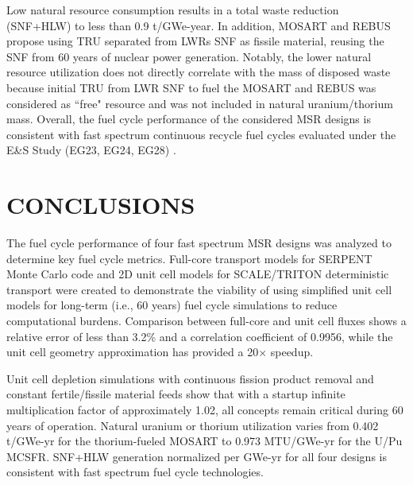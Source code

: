 \documentclass[letterpaper]{mandc2019}
\begin{document}
Low natural resource consumption results in a total waste reduction (\gls{SNF}+\gls{HLW}) to less than 0.9 t/GWe-year. %
In addition, \gls{MOSART} and REBUS propose using \gls{TRU} separated from \glspl{LWR} \gls{SNF} as fissile material, reusing the \gls{SNF} from 60 years of nuclear power generation. 
Notably, the lower natural resource utilization does not directly correlate with the mass of disposed waste because initial TRU from \gls{LWR} \gls{SNF} to fuel the \gls{MOSART} and REBUS was considered as ``free" resource and was not included in natural uranium/thorium mass. 
Overall, the fuel cycle performance of the considered \gls{MSR} designs is consistent with fast spectrum continuous recycle fuel cycles evaluated under the E\&S Study (EG23, EG24, EG28)  \cite{wigeland_nuclear_2014-4}. 
\section{CONCLUSIONS}
The fuel cycle performance of four fast spectrum \gls{MSR} designs was analyzed to determine key fuel cycle metrics. 
Full-core transport models for SERPENT Monte Carlo code and 2D unit cell models for SCALE/TRITON deterministic transport were created to demonstrate the viability of using simplified unit cell models for long-term (i.e., 60 years) fuel cycle simulations to reduce computational burdens. 
Comparison between full-core and unit cell fluxes shows a relative error of less than 3.2\% and a correlation coefficient of 0.9956, while the unit cell geometry approximation has provided a 20$\times$ speedup.

Unit cell depletion simulations with continuous fission product removal and constant fertile/fissile material feeds show that with a startup infinite multiplication factor of approximately 1.02, all concepts remain critical during 60 years of operation. 
Natural uranium or thorium utilization varies from 0.402 t/GWe-yr for the thorium-fueled \gls{MOSART} to 0.973 MTU/GWe-yr for the U/Pu \gls{MCSFR}. 
\gls{SNF}+\gls{HLW} generation normalized per GWe-yr for all four designs is consistent with fast spectrum fuel cycle technologies. %
\end{document}
